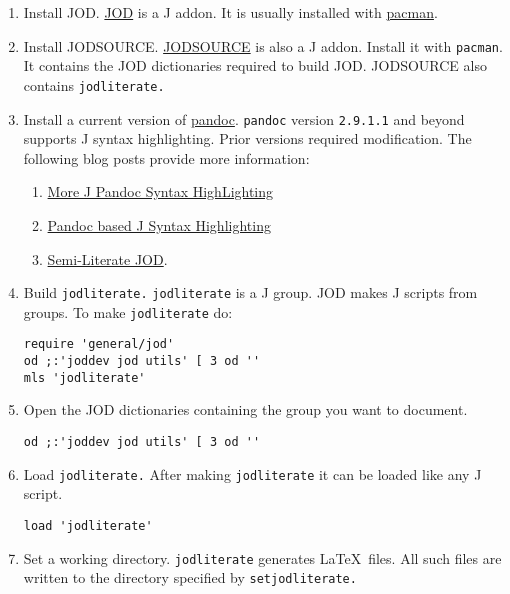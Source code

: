 \begin{enumerate}[1.]
\item
  Install JOD.
  \href{https://code.jsoftware.com/wiki/Addons/general/jod}{JOD} is a J
  addon. It is usually installed with
  \href{https://code.jsoftware.com/wiki/Pacman}{pacman}.
\item
  Install JODSOURCE.
  \href{https://code.jsoftware.com/wiki/Addons/general/jodsource}{JODSOURCE}
  is also a J addon. Install it with \texttt{pacman}. It contains the JOD
  dictionaries required to build JOD. JODSOURCE also contains
  \texttt{jodliterate.}
\item
  Install a current version of \href{https://pandoc.org/}{pandoc}.
  \texttt{pandoc} version \texttt{2.9.1.1} and beyond 
  supports J syntax highlighting. Prior versions required modification. The
  following blog posts provide more information:
      \begin{enumerate}
	  \item \href{https://analyzethedatanotthedrivel.org/2020/02/19/more-j-pandoc-syntax-highlighting/}{More J Pandoc Syntax HighLighting}
	  \item \href{https://analyzethedatanotthedrivel.org/2012/09/20/pandoc-based-j-syntax-highlighting/}{Pandoc based J Syntax Highlighting}
	  \item \href{https://analyzethedatanotthedrivel.org/2012/10/01/semi-literate-jod/}{Semi-Literate JOD}.
	  \end{enumerate}
\item
  Build \texttt{jodliterate.} \texttt{jodliterate} is a J group. JOD
  makes J scripts from groups. To make \texttt{jodliterate} do:

\begin{verbatim}
require 'general/jod'
od ;:'joddev jod utils' [ 3 od ''
mls 'jodliterate'
\end{verbatim}
\item
  Open the JOD dictionaries containing the group you want to document.

\begin{verbatim}
od ;:'joddev jod utils' [ 3 od ''
\end{verbatim}
\item
  Load \texttt{jodliterate.} After making \texttt{jodliterate} it can be
  loaded like any J script.

\begin{verbatim}
load 'jodliterate'
\end{verbatim}
\item
  Set a working directory. \texttt{jodliterate} generates
  \LaTeX~files. All such files are written to the directory specified by
  \texttt{setjodliterate.}


\end{enumerate}
